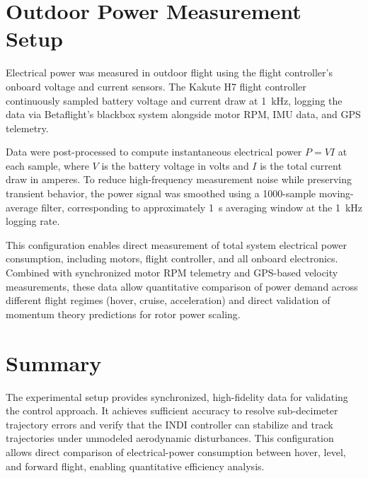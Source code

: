 \section{Outdoor Power Measurement Setup}\label{sec:outdoor-power-setup}

Electrical power was measured in outdoor flight using the flight controller's onboard voltage and current sensors. The Kakute H7 flight controller continuously sampled battery voltage and current draw at \SI{1}{\kilo\hertz}, logging the data via Betaflight's blackbox system alongside motor RPM, IMU data, and GPS telemetry.

Data were post-processed to compute instantaneous electrical power $P = VI$ at each sample, where $V$ is the battery voltage in volts and $I$ is the total current draw in amperes. To reduce high-frequency measurement noise while preserving transient behavior, the power signal was smoothed using a 1000-sample moving-average filter, corresponding to approximately \SI{1}{\second} averaging window at the \SI{1}{\kilo\hertz} logging rate.

This configuration enables direct measurement of total system electrical power consumption, including motors, flight controller, and all onboard electronics. Combined with synchronized motor RPM telemetry and GPS-based velocity measurements, these data allow quantitative comparison of power demand across different flight regimes (hover, cruise, acceleration) and direct validation of momentum theory predictions for rotor power scaling.

\section{Summary}\label{sec:exp-setup-summary}

The experimental setup provides synchronized, high-fidelity data for validating the control approach.
It achieves sufficient accuracy to resolve sub-decimeter trajectory errors and verify that the INDI controller can stabilize and track trajectories under unmodeled aerodynamic disturbances. This configuration allows direct comparison of electrical-power consumption between hover, level, and forward flight, enabling quantitative efficiency analysis.


